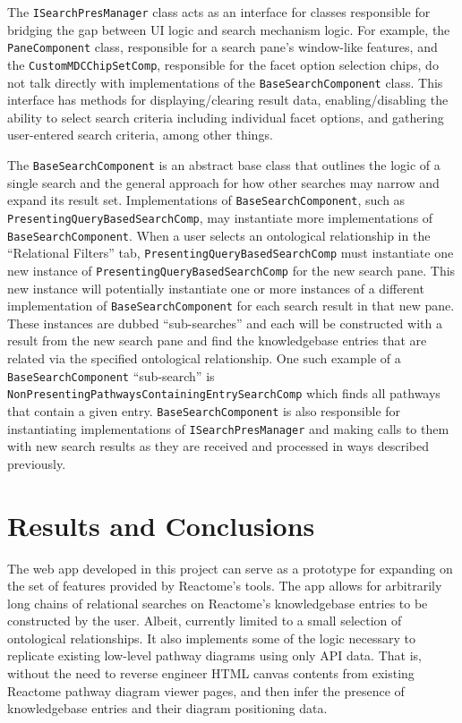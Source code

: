 \documentclass[12pt, letterpaper]{report}
\begin{document}
The \verb|ISearchPresManager| class acts as an interface for classes responsible for bridging the gap between UI logic and search mechanism logic. For example, the \verb|PaneComponent| class, responsible for a search pane's window-like features, and the \verb|CustomMDCChipSetComp|, responsible for the facet option selection chips, do not talk directly with implementations of the \verb|BaseSearchComponent| class. This interface has methods for displaying/clearing result data, enabling/disabling the ability to select search criteria including individual facet options, and gathering user-entered search criteria, among other things.

The \verb|BaseSearchComponent| is an abstract base class that outlines the logic of a single search and the general approach for how other searches may narrow and expand its result set. Implementations of \verb|BaseSearchComponent|, such as \verb|PresentingQueryBasedSearchComp|, may instantiate more implementations of \verb|BaseSearchComponent|. When a user selects an ontological relationship in the ``Relational Filters'' tab, \verb|PresentingQueryBasedSearchComp| must instantiate one new instance of \verb|PresentingQueryBasedSearchComp| for the new search pane. This new instance will potentially instantiate one or more instances of a different implementation of \verb|BaseSearchComponent| for each search result in that new pane. These instances are dubbed ``sub-searches'' and each will be constructed with a result from the new search pane and find the knowledgebase entries that are related via the specified ontological relationship. One such example of a \verb|BaseSearchComponent| ``sub-search'' is \verb|NonPresentingPathwaysContainingEntrySearchComp| which finds all pathways that contain a given entry. \verb|BaseSearchComponent| is also responsible for instantiating implementations of \verb|ISearchPresManager| and making calls to them with new search results as they are received and processed in ways described previously.

\chapter{Results and Conclusions}
The web app developed in this project can serve as a prototype for expanding on the set of features provided by Reactome's tools. The app allows for arbitrarily long chains of relational searches on Reactome's knowledgebase entries to be constructed by the user. Albeit, currently limited to a small selection of ontological relationships. It also implements some of the logic necessary to replicate existing low-level pathway diagrams using only API data. That is, without the need to reverse engineer HTML canvas contents from existing Reactome pathway diagram viewer pages, and then infer the presence of knowledgebase entries and their diagram positioning data.
\end{document}
